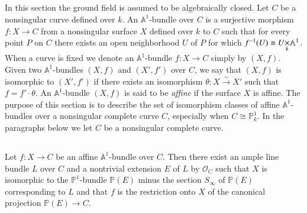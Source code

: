 \subsection{}\label{chap1:5.1}
In this section the ground field is assumed to be algebraically
closed. Let $C$ be a nonsingular curve defined over $k$. An
$\mathbb{A}^{1}$-bundle over $C$ is a surjective morphism $f:X\to C$
from a nonsingular surface $X$ defined over $k$ to $C$ such that for
every point $P$ on $C$ there exists an open neighborhood $U$ of $P$
for which $f^{-1}(U)\cong \fprod{U}{\mathbb{A}^{1}}{k}$. When a curve
is fixed we denote an $\mathbb{A}^{1}$-bundle $f:X\to C$ simply by
$(X,f)$. Given two $\mathbb{A}^{1}$-bundles $(X,f)$ and $(X',f')$ over
$C$, we say that $(X,f)$ is isomorphic to $(X',f')$ if there exists an
isomorphism $\theta:X\xrightarrow{\sim}X'$ such that
$f=f'\cdot\theta$. An $\mathbb{A}^{1}$-bundle $(X,f)$ is said to be
{\em affine} if the surface $X$ is affine. The purpose of this section
is to describe the set of isomorphism classes of affine
$\mathbb{A}^{1}$-bundles over a nonsingular complete curve $C$,
especially when $C\cong \mathbb{P}^{1}_{k}$. In the paragraphs below
we let $C$ be a nonsingular complete curve.

\subsection{}\label{chap1:5.2}
\begin{lemma*}[(\cf 2.4.1) ]
  Let $f:X\to C$ be an affine $\mathbb{A}^{1}$-bundle over $C$. Then
  there exist an ample line bundle $L$ over $C$ and a nontrivial
  extension $E$ of $L$ by $\mathscr{O}_{C}$ such that $X$ is isomorphic
  to the $\mathbb{P}^{1}$-bundle $\mathbb{P}(E)$ minus the section
  $S_{\infty}$ of $\mathbb{P}(E)$ corresponding to $L$ and that $f$ is
  the restriction onto $X$ of the canonical projection $\mathbb{P}(E)\to C$.
\end{lemma*}

